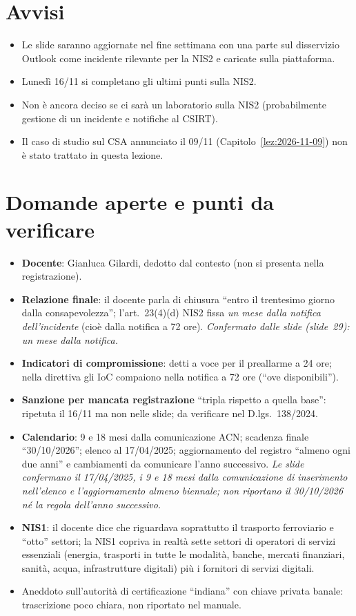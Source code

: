 \section{Avvisi}
\begin{itemize}
  \item Le slide saranno aggiornate nel fine settimana con una parte sul disservizio Outlook come
    incidente rilevante per la NIS2 e caricate sulla piattaforma.
  \item Lunedì 16/11 si completano gli ultimi punti sulla NIS2.
  \item Non è ancora deciso se ci sarà un laboratorio sulla NIS2 (probabilmente gestione di un incidente
    e notifiche al CSIRT).
  \item Il caso di studio sul CSA annunciato il 09/11 (Capitolo~\ref{lez:2026-11-09}) non è stato
    trattato in questa lezione.
\end{itemize}

\section{Domande aperte e punti da verificare}
\begin{verifica}
\begin{itemize}
  \item \textbf{Docente}: Gianluca Gilardi, dedotto dal contesto (non si presenta nella registrazione).
  \item \textbf{Relazione finale}: il docente parla di chiusura ``entro il trentesimo giorno dalla
    consapevolezza''; l'art.~23(4)(d) NIS2 fissa \emph{un mese dalla notifica dell'incidente} (cioè
    dalla notifica a 72 ore). \emph{Confermato dalle slide (slide~29): un mese dalla notifica.}
  \item \textbf{Indicatori di compromissione}: detti a voce per il preallarme a 24 ore; nella direttiva
    gli IoC compaiono nella notifica a 72 ore (``ove disponibili'').
  \item \textbf{Sanzione per mancata registrazione} ``tripla rispetto a quella base'': ripetuta il 16/11
    ma non nelle slide; da verificare nel D.lgs.~138/2024.
  \item \textbf{Calendario}: 9 e 18 mesi dalla comunicazione ACN; scadenza finale ``30/10/2026''; elenco al
    17/04/2025; aggiornamento del registro ``almeno ogni due anni'' e cambiamenti da comunicare l'anno
    successivo. \emph{Le slide confermano il 17/04/2025, i 9 e 18 mesi dalla comunicazione di
    inserimento nell'elenco e l'aggiornamento almeno biennale; non riportano il 30/10/2026 né la regola
    dell'anno successivo.}
  \item \textbf{NIS1}: il docente dice che riguardava soprattutto il trasporto ferroviario e ``otto''
    settori; la NIS1 copriva in realtà sette settori di operatori di servizi essenziali (energia,
    trasporti in tutte le modalità, banche, mercati finanziari, sanità, acqua, infrastrutture digitali)
    più i fornitori di servizi digitali.
  \item Aneddoto sull'autorità di certificazione ``indiana'' con chiave privata banale: trascrizione poco
    chiara, non riportato nel manuale.
\end{itemize}
\end{verifica}
